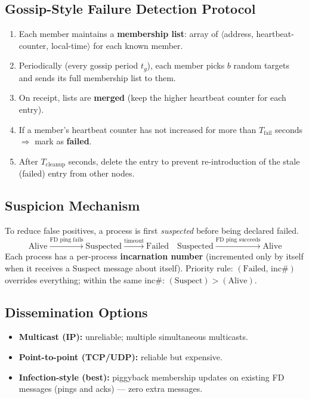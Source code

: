 \documentclass[12pt,a4paper]{article}
\begin{document}
\subsection{Gossip-Style Failure Detection Protocol}
\begin{enumerate}
  \item Each member maintains a \textbf{membership list}: array of
        $\langle$address, heartbeat-counter, local-time$\rangle$ for each known member.
  \item Periodically (every gossip period $t_g$), each member picks $b$ random targets
        and sends its full membership list to them.
  \item On receipt, lists are \textbf{merged} (keep the higher heartbeat counter for each entry).
  \item If a member's heartbeat counter has not increased for more than $T_{\text{fail}}$ seconds
        $\Rightarrow$ mark as \textbf{failed}.
  \item After $T_{\text{cleanup}}$ seconds, delete the entry to prevent re-introduction
        of the stale (failed) entry from other nodes.
\end{enumerate}

\subsection{Suspicion Mechanism}
To reduce false positives, a process is first \emph{suspected} before being declared failed.
\[
\text{Alive} \xrightarrow{\text{FD ping fails}} \text{Suspected}
            \xrightarrow{\text{timeout}} \text{Failed}
\quad
\text{Suspected} \xrightarrow{\text{FD ping succeeds}} \text{Alive}
\]
Each process has a per-process \textbf{incarnation number} (incremented only by itself
when it receives a Suspect message about itself).
Priority rule: $(\text{Failed},\,\text{inc\#})$ overrides everything;
within the same inc\#: $(\text{Suspect}) > (\text{Alive})$.

\subsection{Dissemination Options}
\begin{itemize}
  \item \textbf{Multicast (IP):} unreliable; multiple simultaneous multicasts.
  \item \textbf{Point-to-point (TCP/UDP):} reliable but expensive.
  \item \textbf{Infection-style (best):} piggyback membership updates on existing FD messages
        (pings and acks) — zero extra messages.
\end{itemize}
\end{document}
